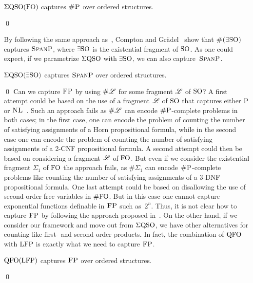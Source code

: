 \begin{prop} \label{prop:capture-shP}
	$\Sigma{\rm QSO}({\rm FO})$ captures $\text{\sc \#P}$ over ordered structures.
\end{prop}
\proof
 
\qed

By following the same approach as~\cite{SalujaST95}, Compton and Gr\"adel~\cite{ComptonG96} show that $\text{\sc \#($\exists{\rm SO}$)}$ captures $\text{\sc SpanP}$, where $\exists{\rm SO}$ is the existential fragment of ${\rm SO}$. As one could expect, if we parametrize $\Sigma{\rm QSO}$ with $\exists{\rm SO}$, we can also capture~$\text{\sc SpanP}$.
\begin{prop} \label{prop:capture-spanP}
	$\Sigma{\rm QSO}(\exists{\rm SO})$ captures $\text{\sc SpanP}$ over ordered structures.
\end{prop}
\proof

\qed
Can we capture $\text{\sc FP}$ by using $\# \mathscr{L}$ for some fragment $\mathscr{L}$ of ${\rm SO}$? A first attempt could be based on the use of a fragment $\mathscr{L}$ of ${\rm SO}$ that captures either $\text{\sc P}$ or $\text{\sc NL}$~\cite{G92}. Such an approach fails as $\# \mathscr{L}$ can encode $\text{\sc \#P}$-complete problems in both cases; in the first case, one can encode the problem of counting the number of satisfying assignments of a Horn  propositional formula, while in the second case one can encode the problem of counting the number of satisfying assignments of a 2-CNF propositional formula. A second attempt could then be based on considering a fragment $\mathscr{L}$ of ${\rm FO}$. 
But even if we consider the existential fragment $\Sigma_1$ of ${\rm FO}$ the approach fails, as $\# \Sigma_1$ can encode $\text{\sc \#P}$-complete problems like counting the number of satisfying assignments of a 3-DNF propositional formula\cite{SalujaST95}. One last attempt could be based on disallowing the use of second-order free variables in $\#{\rm FO}$. But in this case one 
cannot capture exponential functions definable in $\text{\sc FP}$ such as~$2^n$.
Thus, it is not clear how to capture $\text{\sc FP}$ 
by following the approach proposed in~\cite{SalujaST95}. 
On the other hand, if we consider our framework and move out from $\Sigma{\rm QSO}$, we have other alternatives for counting like first- and second-order products. In fact, the combination of ${\rm QFO}$ with ${\rm LFP}$ is exactly what we need to capture $\text{\sc FP}$.
\begin{thm} \label{theo:capture-fp}
	${\rm QFO}({\rm LFP})$ captures $\text{\sc FP}$ over ordered structures.
\end{thm}
\proof

\qed

